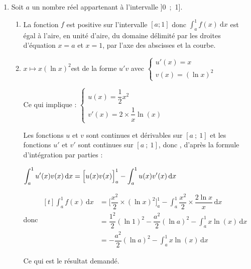 \documentclass[10pt]{article}
\begin{document}
\begin{enumerate}
\begin{enumerate}
Donc, d'après le théorème de la bijection, l'équation $f(x)=2$ admet une unique solution sur l'intervalle $[1~;~+\infty[$.

donc l'équation admet une unique solution  $\alpha$ sur l'intervalle $]0~;~+\infty[$.

\item À l'aide de la calculatrice, on trouve $\alpha \approx 2,46$ donc : \quad  $ 2,4 < \alpha <2,5$. 
	\end{enumerate}
\item Soit $a$ un nombre réel appartenant à l'intervalle ]0~;~1].
	\begin{enumerate}
		\item La fonction $f$ est positive sur l'intervalle $[a;1]$ donc $\displaystyle\int_a^1 f(x)\: \text{d}x$ est égal à l'aire, en unité d'aire,  du domaine délimité par les droites d'équation $x=a$ et $x=1$, par l'axe des abscisses et la courbe. 
		
		\item  $x \longmapsto x \left(\ln x \right)^2$\quad est de la forme $u' v$ avec \quad $\begin{cases}u'(x)=x\\ v(x)=(\ln x)^2 \end{cases}$

Ce qui implique : \quad $\begin{cases}u(x)=\dfrac{1}{2}x^2\\v'(x)=2 \times \dfrac{1}{x}\ln (x)\end{cases}$

Les fonctions $u$ et $v$ sont continues et dérivables sur $[a~;~1]$ et les fonctions $u'$ et $v'$ sont continues sur $[a~;~1]$, donc , d'après la formule d'intégration par parties :

$\displaystyle \int_{a}^{1} u'(x)v(x)\, \mathrm{d}x = \Big [ u(x)v(x)\strut\Big]_{a}^{1} - \int_{a}^{1} u(x)v'(x) \, \mathrm{d}x$\

donc 
$\begin{aligned}[t]
\displaystyle\int_a^1 f(x)\, \mathrm{d}x  & =\Big[ \dfrac{x^2}{2 }\times (\ln x)^2 \Big]_a^{1}-\int_a^{1} \dfrac{x^2}{2} \times \dfrac{2\ln x}{x} \, \mathrm{d}x \\
	& = \dfrac{1^2}{2} (\ln 1)^2  - \dfrac{a^2}{2} (\ln a)^2  - \int_a^{1} x \ln(x) \, \mathrm{d}x \\
	&= - \dfrac{a^2}{2} (\ln a)^2  - \int_a^{1} x \ln(x) \, \mathrm{d}x
\end{aligned}	$

Ce qui est le résultat demandé. 


\end{enumerate}
\end{enumerate}
\end{document}
